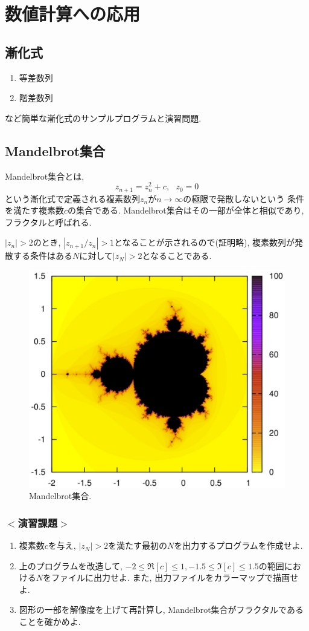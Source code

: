 \documentclass[a4j]{jsarticle}
\begin{document}
\section{数値計算への応用}
\subsection{漸化式}
\begin{enumerate}
\item 等差数列
\item 階差数列
\end{enumerate}
など簡単な漸化式のサンプルプログラムと演習問題. 

\subsection{Mandelbrot集合}
Mandelbrot集合とは, 
\begin{equation}
z_{n+1}=z_n^2+c, \ \ \ z_0=0
\end{equation}
という漸化式で定義される複素数列$z_n$が$n \to \infty$の極限で発散しないという
条件を満たす複素数$c$の集合である. 
Mandelbrot集合はその一部が全体と相似であり, フラクタルと呼ばれる. 

$|z_n|>2$のとき, $|z_{n+1}/z_n|>1$となることが示されるので(証明略), 
複素数列が発散する条件はある$N$に対して$|z_N|>2$となることである. 

\begin{figure}[ht]
\centering
\includegraphics[width=0.75\linewidth]{source/figure/mandel.eps}
\caption{Mandelbrot集合. }
\end{figure}

\subsubsection*{$<$演習課題$>$}
\begin{enumerate}
\item 複素数$c$を与え, $|z_N|>2$を満たす最初の$N$を出力するプログラムを作成せよ. 
\item 上のプログラムを改造して, $-2 \le \Re[c] \le 1, -1.5 \le \Im[c] \le 1.5$の範囲における$N$をファイルに出力せよ. 
また, 出力ファイルをカラーマップで描画せよ. 
\item 図形の一部を解像度を上げて再計算し, Mandelbrot集合がフラクタルであることを確かめよ. 
\end{enumerate}
\end{document}

